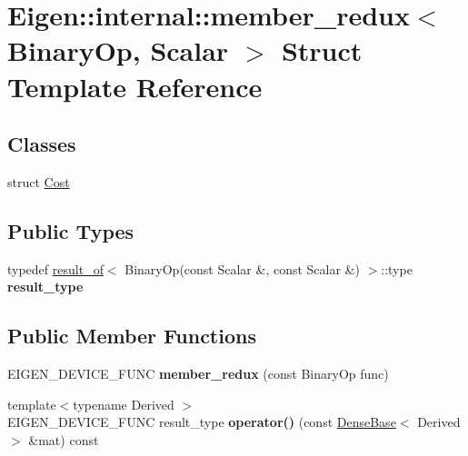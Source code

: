 \hypertarget{struct_eigen_1_1internal_1_1member__redux}{}\section{Eigen\+::internal\+::member\+\_\+redux$<$ Binary\+Op, Scalar $>$ Struct Template Reference}
\label{struct_eigen_1_1internal_1_1member__redux}
\subsection*{Classes}
\begin{DoxyCompactItemize}
\item 
struct \mbox{\hyperlink{struct_eigen_1_1internal_1_1member__redux_1_1_cost}{Cost}}
\end{DoxyCompactItemize}
\subsection*{Public Types}
\begin{DoxyCompactItemize}
\item 
\mbox{\label{struct_eigen_1_1internal_1_1member__redux_a970e1fe440e4fa72b4775865a0ac3071}} 
typedef \mbox{\hyperlink{struct_eigen_1_1internal_1_1result__of}{result\+\_\+of}}$<$ Binary\+Op(const Scalar \&, const Scalar \&) $>$\+::type {\bfseries result\+\_\+type}
\end{DoxyCompactItemize}
\subsection*{Public Member Functions}
\begin{DoxyCompactItemize}
\item 
\mbox{\label{struct_eigen_1_1internal_1_1member__redux_a3834c69fd720e415d64a76d1ad8394ed}} 
E\+I\+G\+E\+N\+\_\+\+D\+E\+V\+I\+C\+E\+\_\+\+F\+U\+NC {\bfseries member\+\_\+redux} (const Binary\+Op func)
\item 
\mbox{\label{struct_eigen_1_1internal_1_1member__redux_aabfb2396430ad31ceb9f0ce2c9085ae8}} 
{\footnotesize template$<$typename Derived $>$ }\\E\+I\+G\+E\+N\+\_\+\+D\+E\+V\+I\+C\+E\+\_\+\+F\+U\+NC result\+\_\+type {\bfseries operator()} (const \mbox{\hyperlink{class_eigen_1_1_dense_base}{Dense\+Base}}$<$ Derived $>$ \&mat) const
\end{DoxyCompactItemize}
